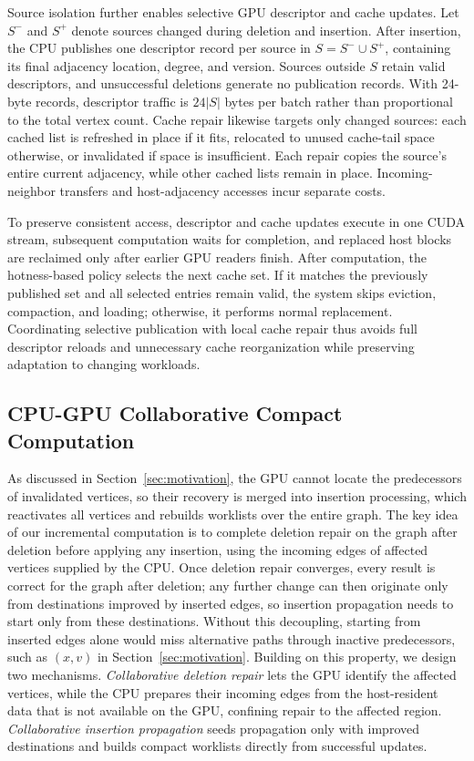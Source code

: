 Source isolation further enables selective GPU descriptor and cache updates. Let $S^-$ and $S^+$ denote sources changed during deletion and insertion. After insertion, the CPU publishes one descriptor record per source in $S=S^-\cup S^+$, containing its final adjacency location, degree, and version. Sources outside $S$ retain valid descriptors, and unsuccessful deletions generate no publication records. With 24-byte records, descriptor traffic is $24|S|$ bytes per batch rather than proportional to the total vertex count. Cache repair likewise targets only changed sources: each cached list is refreshed in place if it fits, relocated to unused cache-tail space otherwise, or invalidated if space is insufficient. Each repair copies the source's entire current adjacency, while other cached lists remain in place. Incoming-neighbor transfers and host-adjacency accesses incur separate costs.

To preserve consistent access, descriptor and cache updates execute in one CUDA stream, subsequent computation waits for completion, and replaced host blocks are reclaimed only after earlier GPU readers finish. After computation, the hotness-based policy selects the next cache set. If it matches the previously published set and all selected entries remain valid, the system skips eviction, compaction, and loading; otherwise, it performs normal replacement. Coordinating selective publication with local cache repair thus avoids full descriptor reloads and unnecessary cache reorganization while preserving adaptation to changing workloads.

\subsection{CPU-GPU Collaborative Compact Computation}
\label{sec:incremental-computation}
As discussed in Section~\ref{sec:motivation}, the GPU cannot locate the predecessors of invalidated vertices, so their recovery is merged into insertion processing, which reactivates all vertices and rebuilds worklists over the entire graph. The key idea of our incremental computation is to complete deletion repair on the graph after deletion before applying any insertion, using the incoming edges of affected vertices supplied by the CPU. Once deletion repair converges, every result is correct for the graph after deletion; any further change can then originate only from destinations improved by inserted edges, so insertion propagation needs to start only from these destinations. Without this decoupling, starting from inserted edges alone would miss alternative paths through inactive predecessors, such as $(x,v)$ in Section~\ref{sec:motivation}. Building on this property, we design two mechanisms. \textit{Collaborative deletion repair} lets the GPU identify the affected vertices, while the CPU prepares their incoming edges from the host-resident data that is not available on the GPU, confining repair to the affected region. \textit{Collaborative insertion propagation} seeds propagation only with improved destinations and builds compact worklists directly from successful updates.

